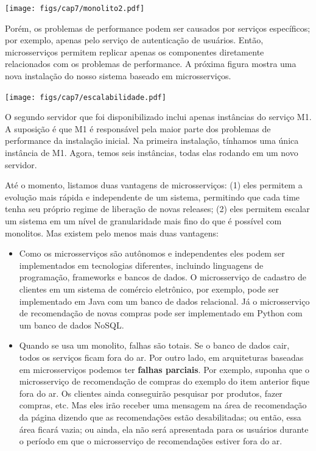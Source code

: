 \documentclass[
  11pt,
  twoside]{book}
\let\origfigure\figure
\let\endorigfigure\endfigure
\renewenvironment{figure}[1][2] {
    \expandafter\origfigure\expandafter[!h]
} {
    \endorigfigure
}
\begin{document}
\begin{figure}
\centering
\texttt{[image: figs/cap7/monolito2.pdf]}
\caption{Servidor 1, executando o monolito em um único processo. E
Servidor 2, executando uma réplica do monolito.}
\end{figure}

Porém, os problemas de performance podem ser causados por serviços
específicos; por exemplo, apenas pelo serviço de autenticação de
usuários. Então, microsserviços permitem replicar apenas os componentes
diretamente relacionados com os problemas de performance. A próxima
figura mostra uma nova instalação do nosso sistema baseado em
microsserviços.

\begin{figure}
\centering
\texttt{[image: figs/cap7/escalabilidade.pdf]}
\caption{Servidor 1, com todos os microsserviços, exceto M1. Servidor 2,
executando seis processos, todos eles relativos a M1.}
\end{figure}

O segundo servidor que foi disponibilizado inclui apenas instâncias do
serviço M1. A suposição é que M1 é responsável pela maior parte dos
problemas de performance da instalação inicial. Na primeira instalação,
tínhamos uma única instância de M1. Agora, temos seis instâncias, todas
elas rodando em um novo servidor.

Até o momento, listamos duas vantagens de microsserviços: (1) eles
permitem a evolução mais rápida e independente de um sistema, permitindo
que cada time tenha seu próprio regime de liberação de novas releases;
(2) eles permitem escalar um sistema em um nível de granularidade mais
fino do que é possível com monolitos. Mas existem pelo menos mais duas
vantagens:

\begin{itemize}
\item
  Como os microsserviços são autônomos e independentes eles podem ser
  implementados em tecnologias diferentes, incluindo linguagens de
  programação, frameworks e bancos de dados. O microsserviço de cadastro
  de clientes em um sistema de comércio eletrônico, por exemplo, pode
  ser implementado em Java com um banco de dados relacional. Já o
  microsserviço de recomendação de novas compras pode ser implementado
  em Python com um banco de dados NoSQL.
\item
  Quando se usa um monolito, falhas são totais. Se o banco de dados
  cair, todos os serviços ficam fora do ar. Por outro lado, em
  arquiteturas baseadas em microsserviços podemos ter \textbf{falhas
  parciais}.  Por exemplo, suponha que o
  microsserviço de recomendação de compras do exemplo do item anterior
  fique fora do ar. Os clientes ainda conseguirão pesquisar por
  produtos, fazer compras, etc. Mas eles irão receber uma mensagem na
  área de recomendação da página dizendo que as recomendações estão
  desabilitadas; ou então, essa área ficará vazia; ou ainda, ela não
  será apresentada para os usuários durante o período em que o
  microsserviço de recomendações estiver fora do ar.
\end{itemize}
\end{document}
